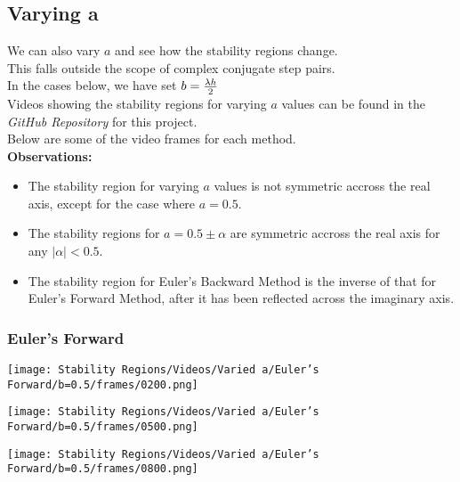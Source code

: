 \subsection{Varying a}
\par We can also vary $a$ and see how the stability regions change.\\
This falls outside the scope of complex conjugate step pairs.\\
In the cases below, we have set $b = \frac{\lambda h}{2}$\\
Videos showing the stability regions for varying $a$ values can be found in the \textit{GitHub Repository}\cite{GitHub_Repo} for this project.\\
Below are some of the video frames for each method.\\
\textbf{Observations:}
\begin{itemize}
	\item The stability region for varying $a$ values is not symmetric accross the real axis, except for the case where $a = 0.5$.
	\item The stability regions for $a = 0.5 \pm \alpha$ are symmetric accross the real axis for any $|\alpha| < 0.5$.
	\item The stability region for Euler's Backward Method is the inverse of that for Euler's Forward Method, after it has been reflected across the imaginary axis.
\end{itemize}
\subsubsection{Euler's Forward}
\begin{multicols}{3}
	\begin{center}
		\texttt{[image: Stability Regions/Videos/Varied a/Euler's Forward/b=0.5/frames/0200.png]}
	\end{center}
	\columnbreak{}
	\begin{center}
		\texttt{[image: Stability Regions/Videos/Varied a/Euler's Forward/b=0.5/frames/0500.png]}
	\end{center}
	\columnbreak{}
	\begin{center}
		\texttt{[image: Stability Regions/Videos/Varied a/Euler's Forward/b=0.5/frames/0800.png]}
	\end{center}
\end{multicols}
